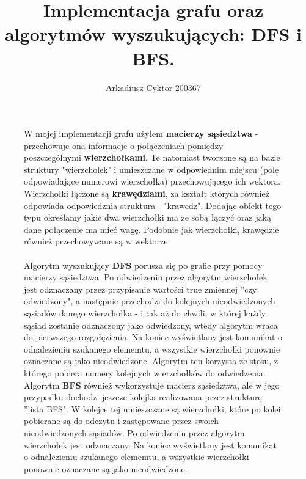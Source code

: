 \documentclass[a4paper,11pt]{report}
\title{Implementacja grafu oraz algorytmów wyszukujących: DFS i BFS.}
\author{Arkadiusz Cyktor 200367}
\begin{document}
\maketitle


\begin{figure}
  W mojej implementacji grafu użyłem \textbf{macierzy sąsiedztwa} - przechowuje ona informacje o połączeniach pomiędzy poszczególnymi \textbf{wierzchołkami}. Te natomiast tworzone są na bazie struktury "wierzcholek" i umieszczane w odpowiednim  miejscu (pole odpowiadające numerowi wierzchołka) przechowującego ich wektora.
\\Wierzchołki łączone są \textbf{krawędziami}, za kształt których również odpowiada odpowiedznia struktura - "krawedz". Dodając obiekt tego typu określamy jakie dwa wierzchołki ma ze sobą łączyć oraz jaką dane połączenie ma mieć wagę. Podobnie jak wierzchołki, krawędzie również przechowywane są w wektorze.
\\
\\Algorytm wyszukujący \textbf{DFS} porusza się po grafie przy pomocy macierzy sąsiedztwa. Po odwiedzeniu przez algorytm wierzchołek jest odznaczany przez przypisanie wartości true zmiennej ''czy odwiedzony", a następnie przechodzi do kolejnych nieodwiedzonych sąsiadów danego wierzchołka - i tak aż do chwili, w której każdy sąsiad zostanie odznaczony jako odwiedzony, wtedy algorytm wraca do pierwszego rozgałęzienia. Na koniec wyświetlany jest komunikat o odnalezieniu szukanego elememtu, a wszystkie wierzchołki ponownie oznaczane są jako nieodwiedzone. Algorytm ten korzysta ze stosu, z którego pobiera numery kolejnych wierzchołków do odwiedzenia.
\\Algorytm \textbf{BFS} również wykorzystuje macierz sąsiedztwa, ale w jego przypadku dochodzi jeszcze kolejka realizowana przez strukturę ''lista BFS". W kolejce tej umieszczane są wierzchołki, które po kolei pobierane są do odczytu i zastępowane przez swoich nieodwiedzonych sąsiadów. Po odwiedzeniu przez algorytm wierzchołek jest odznaczany. Na koniec wyświetlany jest komunikat o odnalezieniu szukanego elememtu, a wszystkie wierzchołki ponownie oznaczane są jako nieodwiedzone.
\end{figure}
\end{document}
